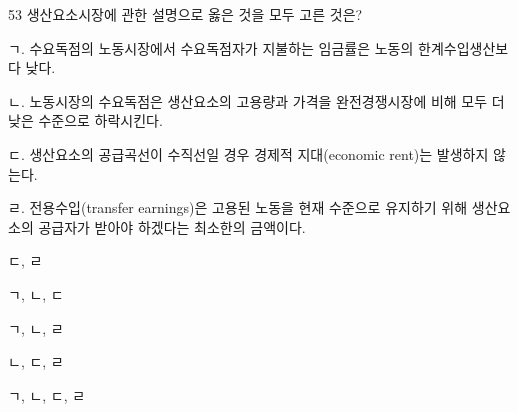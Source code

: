 \begin{question}{53}
생산요소시장에 관한 설명으로 옳은 것을 모두 고른 것은?
\begin{framedtext}
ㄱ. 수요독점의 노동시장에서 수요독점자가 지불하는 임금률은 노동의 한계수입생산보다 낮다. \par
ㄴ. 노동시장의 수요독점은 생산요소의 고용량과 가격을 완전경쟁시장에 비해 모두 더 낮은 수준으로 하락시킨다. \par
ㄷ. 생산요소의 공급곡선이 수직선일 경우 경제적 지대(economic rent)는 발생하지 않는다. \par
ㄹ. 전용수입(transfer earnings)은 고용된 노동을 현재 수준으로 유지하기 위해 생산요소의 공급자가 받아야 하겠다는 최소한의 금액이다. \par
\end{framedtext}
\begin{choices}
  \item ㄷ, ㄹ
  \item ㄱ, ㄴ, ㄷ
  \item ㄱ, ㄴ, ㄹ
  \item ㄴ, ㄷ, ㄹ
  \item ㄱ, ㄴ, ㄷ, ㄹ
\end{choices}
\end{question}

